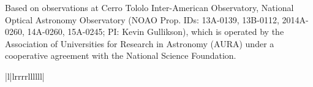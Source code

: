 \documentclass{emulateapj}
\begin{document}
Based on observations at Cerro Tololo Inter-American Observatory, National Optical Astronomy Observatory (NOAO Prop. IDs: 13A-0139, 13B-0112, 2014A-0260, 14A-0260, 15A-0245; PI: Kevin Gullikson), which is operated by the Association of Universities for Research in Astronomy (AURA) under a cooperative agreement with the National Science Foundation. 


\LongTables
\begin{deluxetable*}{|l|lrrrrllllll|}
\tabletypesize{\scriptsize}
\tablewidth{0pt}
       
       
\startdata


\end{deluxetable*}
\end{document}
